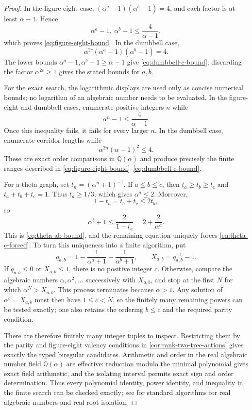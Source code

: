 \documentclass[11pt]{amsart}
\theoremstyle{plain}
\theoremstyle{definition}
\theoremstyle{remark}
\newcommand{\QQ}{\mathbb Q}
\begin{document}
\begin{proof}
In the figure-eight case,
\((\alpha^a-1)(\alpha^b-1)=4\), and each factor is at least
\(\alpha-1\).  Hence
\[
  \alpha^a-1,\ \alpha^b-1\leq\frac4{\alpha-1},
\]
which proves \eqref{eq:figure-eight-bound}.  In the dumbbell case,
\[
  \alpha^{2c}(\alpha^a-1)(\alpha^b-1)=4.
\]
The lower bounds \(\alpha^a-1,\alpha^b-1\geq\alpha-1\) give
\eqref{eq:dumbbell-c-bound}; discarding the factor \(\alpha^{2c}\geq1\)
gives the stated bounds for \(a,b\).

For the exact search, the logarithmic displays are used only as concise
numerical bounds; no logarithm of an algebraic number needs to be evaluated.
In the figure-eight and dumbbell cases, enumerate positive integers \(n\)
while
\begin{equation}\label{eq:effective-ab-algebraic-bound}
  \alpha^n-1\leq\frac{4}{\alpha-1}.
\end{equation}
Once this inequality fails, it fails for every larger \(n\).  In the
dumbbell case, enumerate corridor lengths while
\begin{equation}\label{eq:effective-c-algebraic-bound}
  \alpha^{2n}(\alpha-1)^2\leq4.
\end{equation}
These are exact order comparisons in \(\mathbb Q(\alpha)\) and produce
precisely the finite ranges described in
\eqref{eq:figure-eight-bound}--\eqref{eq:dumbbell-c-bound}.

For a theta graph, set \(t_n=(\alpha^n+1)^{-1}\).  If
\(a\leq b\leq c\), then \(t_a\geq t_b\geq t_c\) and
\(t_a+t_b+t_c=1\).  Thus \(t_a\geq1/3\), which gives
\(\alpha^a\leq2\).  Moreover,
\[
  1-t_a=t_b+t_c\leq2t_b,
\]
so
\[
  \alpha^b+1\leq\frac2{1-t_a}
  =2+\frac2{\alpha^a}.
\]
This is \eqref{eq:theta-ab-bound}, and the remaining equation uniquely
forces \eqref{eq:theta-c-forced}.  To turn this uniqueness into a finite
algorithm, put
\[
  q_{a,b}
  =1-\frac1{\alpha^a+1}-\frac1{\alpha^b+1},
  \qquad
  X_{a,b}=q_{a,b}^{-1}-1.
\]
If \(q_{a,b}\leq0\) or \(X_{a,b}\leq1\), there is no positive integer
\(c\).  Otherwise, compare the algebraic numbers
\(\alpha,\alpha^2,\ldots\) successively with \(X_{a,b}\), and stop at the
first \(N\) for which \(\alpha^N>X_{a,b}\).  This process terminates because
\(\alpha>1\).  Any solution of \(\alpha^c=X_{a,b}\) must then have
\(1\leq c<N\), so the finitely many remaining powers can be tested exactly;
one also retains the ordering \(b\leq c\) and the required parity condition.

There are therefore finitely many integer tuples to inspect.  Restricting
them by the parity and figure-eight valency conditions in
\cref{cor:rank-two-tree-actions} gives exactly the typed biregular
candidates.  Arithmetic and order in the real algebraic number field
\(\QQ(\alpha)\) are effective: reduction modulo the minimal polynomial gives
exact field arithmetic, and the isolating interval permits exact sign and
order determination.  Thus every polynomial identity, power identity, and
inequality in the finite search can be checked exactly; see
\cite{BasuPollackRoy2006} for standard algorithms for real algebraic numbers
and real-root isolation.
\end{proof}
\end{document}
